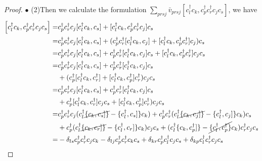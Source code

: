 \begin{proof}
    $\bullet$ (2)Then we calculate the formulation $\sum\limits_{prsj} \bar{v}_{p r s j}\left[c_{l}^{\dagger} c_{k}, c_{p}^{\dagger} c_{r}^{\dagger} c_{j} c_{s}\right]$, we have
    \begin{equation}
      \begin{aligned}
        \left[c_{l}^{\dagger} c_{k}, c_{p}^{\dagger} c_{r}^{\dagger} c_{j} c_{s}\right] =& c_{p}^{\dagger} c_{r}^{\dagger} c_{j}[c_{l}^{\dagger} c_{k}, c_{s}] + [c_{l}^{\dagger} c_{k},c_{p}^{\dagger} c_{r}^{\dagger} c_{j} ]c_{s}\\
        =&c_{p}^{\dagger} c_{r}^{\dagger} c_{j}[c_{l}^{\dagger} c_{k}, c_{s}]+ (c_{p}^{\dagger} c_{r}^{\dagger}[c_{l}^{\dagger} c_{k},c_{j} ]+[c_{l}^{\dagger} c_{k},c_{p}^{\dagger} c_{r}^{\dagger}  ]c_{j})c_{s}\\
        =&c_{p}^{\dagger} c_{r}^{\dagger} c_{j}[c_{l}^{\dagger} c_{k}, c_{s}]+ c_{p}^{\dagger} c_{r}^{\dagger}[c_{l}^{\dagger} c_{k},c_{j} ]c_{s}+[c_{l}^{\dagger} c_{k},c_{p}^{\dagger} c_{r}^{\dagger}]c_{j}c_{s}\\
        =&c_{p}^{\dagger} c_{r}^{\dagger} c_{j}[c_{l}^{\dagger} c_{k}, c_{s}]+ c_{p}^{\dagger} c_{r}^{\dagger}[c_{l}^{\dagger} c_{k},c_{j} ]c_{s}\\
         &+(c_{p}^{\dagger}[ c_{l}^{\dagger} c_{k}, c_{r}^{\dagger} ] + [ c_{l}^{\dagger} c_{k},c_{p}^{\dagger} ]c_{r}^{\dagger})c_{j}c_{s}\\
        =&c_{p}^{\dagger} c_{r}^{\dagger} c_{j}[c_{l}^{\dagger} c_{k}, c_{s}]+ c_{p}^{\dagger} c_{r}^{\dagger}[c_{l}^{\dagger} c_{k},c_{j} ]c_{s}\\
         &+c_{p}^{\dagger}[ c_{l}^{\dagger} c_{k}, c_{r}^{\dagger} ]c_j c_{s} + [ c_{l}^{\dagger} c_{k},c_{p}^{\dagger} ]c_{r}^{\dagger})c_{j}c_{s}\\
        =&c_{p}^{\dagger} c_{r}^{\dagger} c_{j}(c_{l}^{\dagger} \cancel{\{c_{k}, c_{s}]\}} - \{c_{l}^{\dagger}, c_{s}]\}c_{k})+ c_{p}^{\dagger} c_{r}^{\dagger}(c_{l}^{\dagger} \cancel{\{c_{k}, c_{j}]\}} - \{c_{l}^{\dagger}, c_{j}]\}c_{k})c_{s}\\
        &+c_{p}^{\dagger}(c_{l}^{\dagger} \cancel{\{c_{k}, c_{r}]\}} - \{c_{l}^{\dagger}, c_{r}]\}c_{k})c_{j}c_{s} + (c_{l}^{\dagger}\{c_{k}, c_{p}^\dagger]\} - \cancel{\{c_{l}^{\dagger}, c_{p}^\dagger\}}c_{k})c_{r}^{\dagger}c_{j}c_{s}\\
        =&-\delta_{ls}c_p^\dagger c_r^\dagger c_j c_k -\delta_{lj}c_p^\dagger c_r^\dagger c_k c_s + \delta_{kr}c_p^\dagger c_l^\dagger c_j c_s + \delta_{kp}c_l^\dagger c_r^\dagger c_j c_s \label{tdhf13}
      \end{aligned}

\end{equation}
\end{proof}
